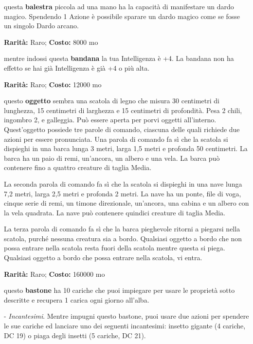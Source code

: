 \begin{multicols}{2}
questa \textbf{balestra} piccola ad una mano ha la capacità di manifestare un dardo magico.
Spendendo 1 Azione è possibile sparare un dardo magico come se fosse un singolo Dardo arcano.


\textbf{Rarità:} Raro; \textbf{Costo:} 8000 mo

mentre indossi questa \textbf{bandana} la tua Intelligenza è +4. La bandana non ha effetto se hai già Intelligenza è già +4 o più alta.


\textbf{Rarità:} Raro; \textbf{Costo:} 12000 mo

questo \textbf{oggetto} sembra una scatola di legno che misura 30 centimetri di lunghezza, 15 centimetri di larghezza e 15 centimetri di profondità. Pesa 2 chili, ingombro 2, e galleggia. Può essere aperta per porvi oggetti all'interno. Quest'oggetto possiede tre parole di comando, ciascuna delle quali richiede due azioni per essere pronunciata. Una parola di comando fa sì che la scatola si dispieghi in una barca lunga 3 metri, larga 1,5 metri e profonda 50 centimetri. La barca ha un paio di remi, un'ancora, un albero e una vela. La barca può contenere fino a quattro creature di taglia Media.

La seconda parola di comando fa sì che la scatola si dispieghi in una nave lunga 7,2 metri, larga 2,5 metri e profonda 2 metri. La nave ha un ponte, file di voga, cinque serie di remi, un timone direzionale, un'ancora, una cabina e un albero con la vela quadrata. La nave può contenere quindici creature di taglia Media.

La terza parola di comando fa sì che la barca pieghevole ritorni a piegarsi nella scatola, purché nessuna creatura sia a bordo. Qualsiasi oggetto a bordo che non possa entrare nella scatola resta fuori della scatola mentre questa si piega. Qualsiasi oggetto a bordo che possa entrare nella scatola, vi entra.


\textbf{Rarità:} Raro; \textbf{Costo:} 160000 mo

questo \textbf{bastone} ha 10 cariche che puoi impiegare per usare le proprietà sotto descritte e recupera 1 carica ogni giorno all'alba.

- \emph{Incantesimi}. Mentre impugni questo bastone, puoi usare due azioni per spendere le sue cariche ed lanciare uno dei seguenti incantesimi: insetto gigante (4 cariche, DC 19) o piaga degli insetti (5 cariche, DC 21).


\end{multicols}
